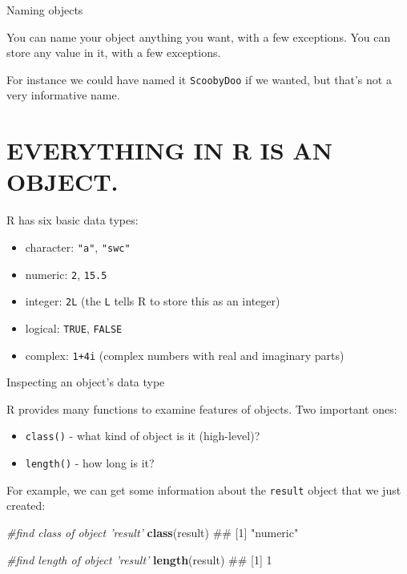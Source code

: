 \documentclass[ignorenonframetext,]{beamer}
\newenvironment{Shaded}{\begin{snugshade}}{\end{snugshade}}
\newcommand{\KeywordTok}[1]{\textcolor[rgb]{0.13,0.29,0.53}{\textbf{#1}}}
\newcommand{\CommentTok}[1]{\textcolor[rgb]{0.56,0.35,0.01}{\textit{#1}}}
\newcommand{\NormalTok}[1]{#1}
\providecommand{\tightlist}{%
  \setlength{\itemsep}{0pt}\setlength{\parskip}{0pt}}
\begin{document}
\begin{frame}[fragile]{Naming objects}

You can name your object anything you want, with a few exceptions. You
can store any value in it, with a few exceptions.

For instance we could have named it \texttt{ScoobyDoo} if we wanted, but
that's not a very informative name.

\end{frame}

\section{EVERYTHING IN R IS AN
OBJECT.}\label{everything-in-r-is-an-object.}

\begin{frame}[fragile]{R has six basic data types:}

\begin{itemize}[<+->]
\tightlist
\item
  character: \texttt{"a"}, \texttt{"swc"}
\item
  numeric: \texttt{2}, \texttt{15.5}
\item
  integer: \texttt{2L} (the \texttt{L} tells R to store this as an
  integer)
\item
  logical: \texttt{TRUE}, \texttt{FALSE}
\item
  complex: \texttt{1+4i} (complex numbers with real and imaginary parts)
\end{itemize}

\end{frame}

\begin{frame}[fragile]{Inspecting an object's data type}

R provides many functions to examine features of objects. Two important
ones:

\begin{itemize}[<+->]
\tightlist
\item
  \texttt{class()} - what kind of object is it (high-level)?
\item
  \texttt{length()} - how long is it?
\end{itemize}

For example, we can get some information about the \texttt{result}
object that we just created:

\begin{Shaded}
\begin{Highlighting}[]
\CommentTok{#find class of object 'result'}
\KeywordTok{class}\NormalTok{(result)}
\NormalTok{## [1] "numeric"}

\CommentTok{#find length of object 'result'}
\KeywordTok{length}\NormalTok{(result)}
\NormalTok{## [1] 1}
\end{Highlighting}
\end{Shaded}

\end{frame}
\end{document}
